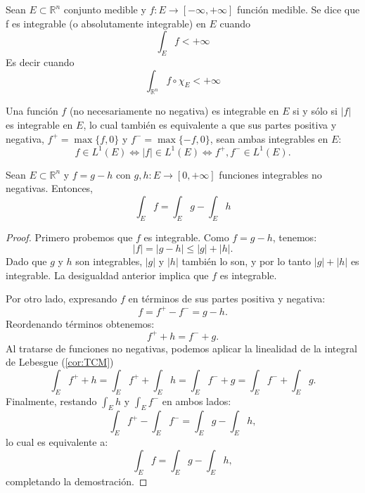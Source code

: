 \begin{definición}
Sean $E \subset \mathbb{R}^n$ conjunto medible y $f: E \to [-\infty, +\infty]$ función medible. Se dice que f es integrable (o absolutamente integrable) en $E$ cuando 
$$\int_{E}f < +\infty$$ 
Es decir cuando 
$$\int_{\mathbb{R}^n}f \circ \chi_E < +\infty$$
\end{definición}

\begin{observación}
    Una función \( f \) (no necesariamente no negativa) es integrable en \( E \) si y sólo si \( |f| \) es integrable en \( E \), lo cual también es equivalente a que sus partes positiva y negativa, \( f^+ = \max\{f, 0\} \) y \( f^- = \max\{-f, 0\} \), sean ambas integrables en \( E \):
    \[
    f \in L^1(E) \iff |f| \in L^1(E) \iff f^+, f^- \in L^1(E).
    \]
\end{observación}

\begin{lema}
    Sean $E \subset \mathbb{R}^n$ y $f = g - h$ con $g, h: E \to [0, +\infty]$ funciones integrables no negativas. Entonces, $$ \int_{E}f = \int_{E}g - \int_{E}h$$
    \label{lema:IntegralResta}
\end{lema}

\begin{proof}
    Primero probemos que $f$ es integrable. Como $f = g - h$, tenemos:
    \[ |f| = |g - h| \leq |g| + |h|. \]
    Dado que $g$ y $h$ son integrables, $|g|$ y $|h|$ también lo son, y por lo tanto $|g| + |h|$ es integrable. La desigualdad anterior implica que $f$ es integrable.

    Por otro lado, expresando $f$ en términos de sus partes positiva y negativa:
    \[ f = f^+ - f^- = g - h. \]
    Reordenando términos obtenemos:
    \[ f^+ + h = f^- + g. \]
    Al tratarse de funciones no negativas, podemos aplicar la linealidad de la integral de Lebesgue (\cref{cor:TCM})
    \[ \int_{E} f^+ + h = \int_{E} f^+ + \int_{E} h = \int_{E} f^- + g = \int_{E} f^- + \int_{E} g. \]
    Finalmente, restando $\int_{E} h$ y $\int_{E} f^-$ en ambos lados:
    \[ \int_{E} f^+ - \int_{E} f^- = \int_{E} g - \int_{E} h, \]
    lo cual es equivalente a:
    \[ \int_{E} f = \int_{E} g - \int_{E} h, \]
    completando la demostración.
\end{proof}

